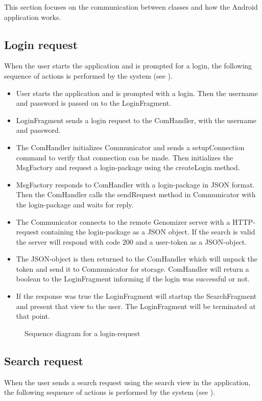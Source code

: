 This section focuses on the communication  between classes and how the Android application works.
\subsection{Login request}
	When the user starts the application and is prompted for a login, the following sequence of actions is performed by the system (see ).
	
	\begin{itemize}
		\item
			User starts the application and is prompted with a login.
			Then the username and password is passed on to the LoginFragment.
		\item
			LoginFragment sends a login request to the ComHandler, with the username and password.
		\item
			The ComHandler initializes Communicator and sends a setupConnection command to verify that connection can be made.
			Then initializes the MsgFactory and request a login-package using the createLogin method.
		\item
			MsgFactory responds to ComHandler with a login-package in JSON format.
			Then the ComHandler calls the sendRequest method in Communicator with the login-package and waits for reply.
		\item
			The Communicator connects to the remote Genomizer server with a HTTP-request containing the login-package as a JSON object.
			If the search is valid the server will respond with code 200 and a user-token as a JSON-object.
		\item
			The JSON-object is then returned to the ComHandler which will unpack the token and send it to Communicator for storage.
			ComHandler will return a boolean to the LoginFragment informing if the login was successful or not.
		\item 
			If the response was true the LoginFragment will startup the SearchFragment and present that view to the user.
			The LoginFragment will be terminated at that point. 
			
	\end{itemize}

	\begin{figure}[h]
		\caption{Sequence diagram for a login-request}
		\label{fig:and_loginseq}
	\end{figure}
	\FloatBarrier
\subsection{Search request}
	When the user sends a search request using the search view in the application, the following sequence of actions is performed by the system
	(see ).
	
